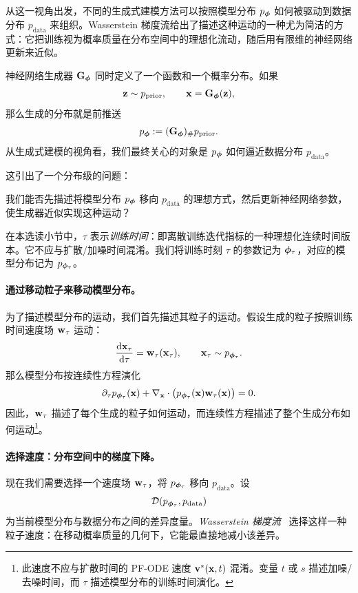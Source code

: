 从这一视角出发，不同的生成式建模方法可以按照模型分布 $p_{{\bm{\phi}}}$ 如何被驱动到数据分布 $p_{\mathrm{data}}$ 来组织。Wasserstein 梯度流给出了描述这种运动的一种尤为简洁的方式：它把训练视为概率质量在分布空间中的理想化流动，随后用有限维的神经网络更新来近似。


神经网络生成器 ${\mathbf{G}}_{{\bm{\phi}}}$ 同时定义了一个函数和一个概率分布。如果
\[
    {\mathbf{z}}\sim p_{\mathrm{prior}},
    \qquad
    {\mathbf{x}}={\mathbf{G}}_{{\bm{\phi}}}({\mathbf{z}}),
\]
那么生成的分布就是前推送
\[
    p_{{\bm{\phi}}}:=({\mathbf{G}}_{{\bm{\phi}}})_\# p_{\mathrm{prior}}.
\]
从生成式建模的视角看，我们最终关心的对象是 $p_{{\bm{\phi}}}$ 如何逼近数据分布 $p_{\mathrm{data}}$。

这引出了一个分布级的问题：
\begin{question}
我们能否先描述将模型分布 $p_{{\bm{\phi}}}$ 移向 $p_{\mathrm{data}}$ 的理想方式，然后更新神经网络参数，使生成器近似实现这种运动？
\end{question}

在本选读小节中，$\tau$ 表示\emph{训练时间}：即离散训练迭代指标的一种理想化连续时间版本。它不应与扩散/加噪时间混淆。我们将训练时刻 $\tau$ 的参数记为 ${\bm{\phi}}_\tau$，对应的模型分布记为 $p_{{\bm{\phi}}_\tau}$。

\paragraph{通过移动粒子来移动模型分布。}
为了描述模型分布的运动，我们首先描述其粒子的运动。假设生成的粒子按照训练时间速度场 ${\mathbf{w}}_\tau$ 运动：
\[
    \frac{\mathop{}\!\mathrm{d} {\mathbf{x}}_\tau}{\mathop{}\!\mathrm{d} \tau}
    =
    {\mathbf{w}}_\tau({\mathbf{x}}_\tau),
    \qquad
    {\mathbf{x}}_\tau\sim p_{{\bm{\phi}}_\tau}.
\]
那么模型分布按连续性方程演化
\[
    \partial_\tau p_{{\bm{\phi}}_\tau}({\mathbf{x}})
    +
    \nabla_{{\mathbf{x}}}\cdot
    \big(
        p_{{\bm{\phi}}_\tau}({\mathbf{x}}){\mathbf{w}}_\tau({\mathbf{x}})
    \big)
    =
    0.
\]
因此，${\mathbf{w}}_\tau$ 描述了每个生成的粒子如何运动，而连续性方程描述了整个生成分布如何运动\footnote{此速度不应与扩散时间的 PF-ODE 速度 ${\mathbf{v}}^*({\mathbf{x}},t)$ 混淆。变量 $t$ 或 $s$ 描述加噪/去噪时间，而 $\tau$ 描述模型分布的训练时间演化。}。



\paragraph{选择速度：分布空间中的梯度下降。}
现在我们需要选择一个速度场 ${\mathbf{w}}_\tau$，将 $p_{{\bm{\phi}}_\tau}$ 移向 $p_{\mathrm{data}}$。设
\[
    \mathcal{D}(p_{{\bm{\phi}}_\tau},p_{\mathrm{data}})
\]
为当前模型分布与数据分布之间的差异度量。\emph{Wasserstein 梯度流}~\citep{jordan1998variational,ambrosio2005gradient} 选择这样一种粒子速度：在移动概率质量的几何下，它能最直接地减小该差异。

